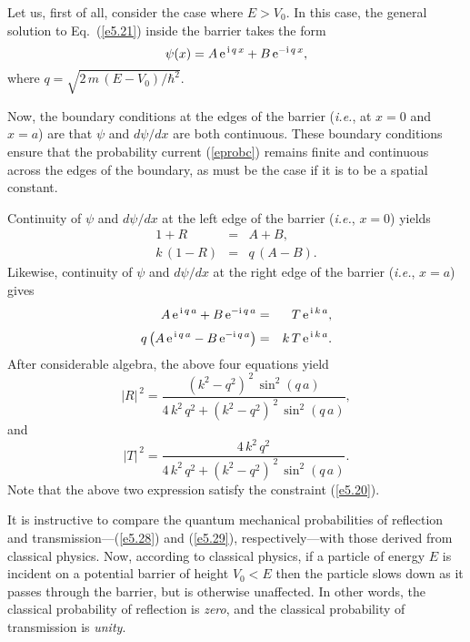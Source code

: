 Let us, first of all, consider the case where $E> V_0$. In this case, the general
solution to Eq.~(\ref{e5.21}) inside the barrier takes the
form
\begin{equation}
\psi(x) = A\,{\rm e}^{\,{\rm i}\,q\,x} +B\,{\rm e}^{-{\rm i}\,q\,x},
\end{equation}
where $q=\sqrt{2\,m\,(E-V_0)/\hbar^2}$. 

Now, the boundary conditions at the edges of the barrier ({\em i.e.}, at
$x=0$ and $x=a$) are that $\psi$ and $d\psi/d x$ are both
continuous. These boundary conditions ensure that the probability current
(\ref{eprobc}) remains finite and continuous across the edges of the boundary, as must be the
case if it is to be a spatial constant.

Continuity of $\psi$ and $d\psi/d x$ at the left edge of
the barrier ({\em i.e.}, $x=0$) yields
\begin{eqnarray}
1 + R &=& A+B,\\[0.5ex]
k\,(1-R) &=& q\,(A-B).
\end{eqnarray}
Likewise, continuity of $\psi$ and $d\psi/d x$ at the right edge of
the barrier ({\em i.e.}, $x=a$) gives
\begin{eqnarray}
A\, {\rm e}^{\,{\rm i}\,q\,a}+ B \,{\rm e}^{-{\rm i}\,q\,a} &=& T\,{\rm e}^{\,{\rm i}\,k\,a},\\[0.5ex]
q\left(A\,{\rm e}^{\,{\rm i}\,q\,a} -B \,{\rm e}^{-{\rm i}\,q\,a}\right) &=& k\,T\,{\rm e}^{\,{\rm i}\,k\,a}.
\end{eqnarray}
After considerable algebra, the above four equations yield
\begin{equation}\label{e5.28}
|R|^{\,2} = \frac{(k^2-q^2)^{\,2}\,\sin^2(q\,a)}{4\,k^2\,q^2 + (k^2-q^2)^{\,2}\,\sin^2(q\,a)},
\end{equation}
and
\begin{equation}\label{e5.29}
|T|^{\,2} = \frac{4\,k^2\,q^2}{4\,k^2\,q^2 + (k^2-q^2)^{\,2}\,\sin^2(q\,a)}.
\end{equation}
Note that the above two expression satisfy the constraint (\ref{e5.20}).

It is instructive to compare the quantum mechanical probabilities
of reflection and transmission---(\ref{e5.28}) and (\ref{e5.29}), respectively---with those derived from classical physics. Now, according
to classical physics, if a particle of energy $E$ is incident on
a potential barrier of height $V_0<E$ then the particle slows down
as it passes through the barrier, but is otherwise unaffected.
In other words, the classical probability of reflection is
{\em zero}, and the classical probability of transmission is {\em unity}.

